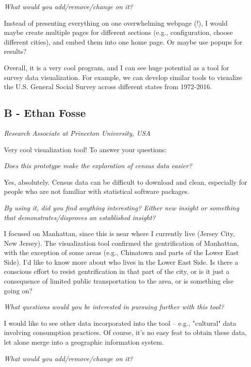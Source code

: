 \documentclass[a4paper]{article}
\newcommand{\question}[1]{\smallskip\noindent\emph{#1}}
\begin{document}
 
\question{What would you add/remove/change on it?}
 

Instead of presenting everything on one overwhelming webpage (!), I would maybe
create multiple pages for different sections (e.g., configuration, choose
different cities), and embed them into one home page. Or maybe use popups for
results?
 
 
Overall, it is a very cool program, and I can see huge potential as a tool for
survey data visualization. For example, we can develop similar tools to
visualize the U.S. General Social Survey across different states from 1972-2016.


\subsection{B - Ethan Fosse}
\emph{Research Associate at Princeton University, USA}

Very cool visualization tool! To answer your questions:

\question{Does this prototype make the exploration of census data easier?}

Yes, absolutely. Census data can be difficult to download and clean, especially
for people who are not familiar with statistical software packages.

\question{By using it, did you find anything interesting? Either new insight or
something that demonstrates/disproves an established insight?}

I focused on Manhattan, since this is near where I currently live (Jersey City,
New Jersey). The visualization tool confirmed the gentrification of Manhattan,
with the exception of some areas (e.g., Chinatown and parts of the Lower East
Side). I'd like to know more about who lives in the Lower East Side. Is there a
conscious effort to resist gentrification in that part of the city, or is it
just a consequence of limited public transportation to the area, or is something
else going on?
 
\question{What questions would you be interested in pursuing further with this tool? }

I would like to see other data incorporated into the tool -- e.g., "cultural"
data involving consumption practices. Of course, it's no easy feat to obtain
these data, let alone merge into a geographic information system.

\question{What would you add/remove/change on it?}
\end{document}
